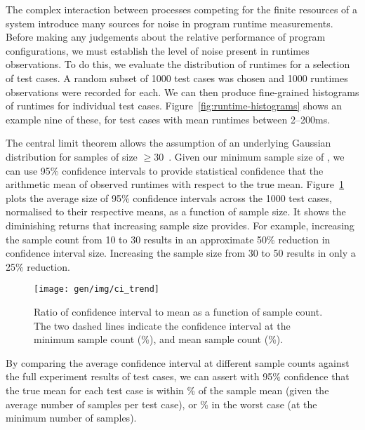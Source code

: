 The complex interaction between processes competing for the finite
resources of a system introduce many sources for noise in program
runtime measurements. Before making any judgements about the relative
performance of program configurations, we must establish the level of
noise present in runtimes observations. To do this, we evaluate the
distribution of runtimes for a selection of test cases. A random
subset of 1000 test cases was chosen and 1000 runtimes observations
were recorded for each. We can then produce fine-grained histograms of
runtimes for individual test
cases. Figure~\ref{fig:runtime-histograms} shows an example nine of
these, for test cases with mean runtimes between 2--200ms.

The central limit theorem allows the assumption of an underlying
Gaussian distribution for samples of size $\ge 30$~\cite{Georges2007}.
Given our minimum sample size of , we can
use 95\% confidence intervals to provide statistical confidence that
the arithmetic mean of observed runtimes with respect to the true
mean. Figure~\ref{fig:ci-trends} plots the average size of 95\%
confidence intervals across the 1000 test cases, normalised to their
respective means, as a function of sample size. It shows the
diminishing returns that increasing sample size provides. For example,
increasing the sample count from 10 to 30 results in an approximate
50\% reduction in confidence interval size. Increasing the sample size
from 30 to 50 results in only a 25\% reduction.

\begin{figure}
\centering
\texttt{[image: gen/img/ci\_trend]}
\caption{%
  Ratio of confidence interval to mean as a function of sample
  count. The two dashed lines indicate the confidence interval at the
  minimum sample count (\%), and mean sample count
  (\%).%
}
\label{fig:ci-trends}
\end{figure}

By comparing the average confidence interval at different sample
counts against the full experiment results of
 test cases, we can assert with 95\%
confidence that the true mean for each test case is within
\% of the sample mean (given the average number of
samples per test case), or \% in the worst case (at
the minimum number of samples).


